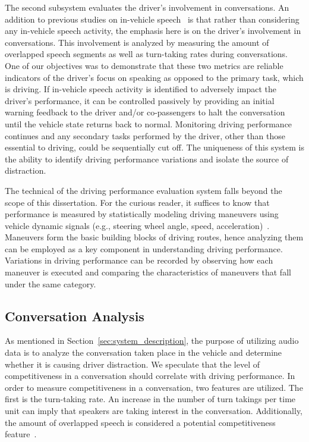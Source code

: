 The second subsystem evaluates the driver's involvement in conversations. 
An addition to previous studies on in-vehicle speech~\cite{ESPA} is that rather than considering any in-vehicle speech activity, the emphasis here is on the driver's involvement in conversations. 
This involvement is analyzed by measuring the amount of overlapped speech segments as well as turn-taking rates during conversations. 
One of our objectives was to demonstrate that these two metrics are reliable indicators of the driver's focus on speaking as opposed to the primary task, which is driving. 
If in-vehicle speech activity is identified to adversely impact the driver's performance, it can be controlled passively by providing an initial warning feedback to the driver and/or co-passengers to halt the conversation until the vehicle state returns back to normal. 
Monitoring driving performance continues and any secondary tasks performed by the driver, other than those essential to driving, could be sequentially cut off. 
The uniqueness of this system is the ability to identify driving performance variations and isolate the source of distraction. 

The technical of the driving performance evaluation system falls beyond the scope of this dissertation. 
For the curious reader, it suffices to know that performance is measured by statistically modeling driving maneuvers using vehicle dynamic signals (e.g., steering wheel angle, speed, acceleration)~\cite{sathyanarayana2013belt}. 
Maneuvers form the basic building blocks of driving routes, hence analyzing them can be employed as a key component in understanding driving performance. 
Variations in driving performance can be recorded by observing how each maneuver is executed and comparing the characteristics of maneuvers that fall under the same category. 

\subsection{Conversation Analysis}
\label{sec:conversation_analysis}
As mentioned in Section~\ref{sec:system_description}, the purpose of utilizing audio data is to analyze the conversation taken place in the vehicle and determine whether it is causing driver distraction. 
We speculate that the level of competitiveness in a conversation should correlate with driving performance. 
In order to measure competitiveness in a conversation, two features are utilized. 
The first is the turn-taking rate. 
An increase in the number of turn takings per time unit can imply that speakers are taking interest in the conversation. 
Additionally, the amount of overlapped speech is considered a potential competitiveness feature~\cite{Schegloff}. 

